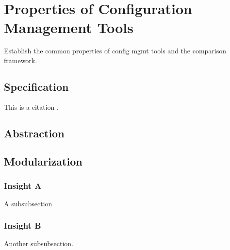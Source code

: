 \section{Properties of Configuration Management Tools}

Establish the common properties of config mgmt tools and
the comparison framework.

\subsection{Specification}

This is a citation \cite{Lamport:LaTeX}.

\subsection{Abstraction}

\subsection{Modularization}


\subsubsection{Insight A}

A subsubsection

\subsubsection{Insight B}
Another subsubsection.
